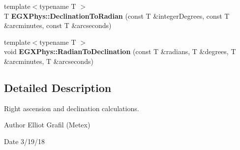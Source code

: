 \begin{DoxyCompactItemize}
\item 
{\footnotesize template$<$typename T $>$ }\\T {\bfseries E\+G\+X\+Phys\+::\+Declination\+To\+Radian} (const T \&integer\+Degrees, const T \&arcminutes, const T \&arcseconds)
\item 
{\footnotesize template$<$typename T $>$ }\\void {\bfseries E\+G\+X\+Phys\+::\+Radian\+To\+Declination} (const T \&radians, T \&degrees, T \&arcminutes, T \&arcseconds)
\end{DoxyCompactItemize}


\subsection{Detailed Description}
Right ascension and declination calculations. 

\begin{DoxyAuthor}{Author}
Elliot Grafil (Metex) 
\end{DoxyAuthor}
\begin{DoxyDate}{Date}
3/19/18 
\end{DoxyDate}
